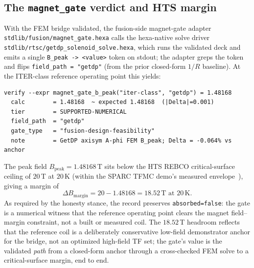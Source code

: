 \subsection{The \texttt{magnet\_gate} verdict and HTS margin}
\label{app:magnet:gate}

With the FEM bridge validated, the fusion-side magnet-gate adapter
\texttt{stdlib/fusion/magnet\_gate.hexa} calls the hexa-native solve driver
\texttt{stdlib/rtsc/getdp\_solenoid\_solve.hexa}, which runs the validated
deck and emits a single \verb|B_peak -> <value>| token on stdout; the adapter
greps the token and flips \texttt{field\_path = "getdp"} (from the prior
closed-form $1/R$ baseline). At the ITER-class reference operating point this
yields:
\begin{lstlisting}
verify --expr magnet_gate_b_peak("iter-class", "getdp") = 1.48168
  calc        = 1.48168  ~ expected 1.48168  (|Delta|=0.001)
  tier        = SUPPORTED-NUMERICAL
  field_path  = "getdp"
  gate_type   = "fusion-design-feasibility"
  note        = GetDP axisym A-phi FEM B_peak; Delta = -0.064% vs anchor
\end{lstlisting}
The peak field $B_{\text{peak}} = 1.48168$\,T sits below the HTS REBCO
critical-surface ceiling of $20$\,T at $20$\,K (within the SPARC TFMC demo's
measured envelope~\citep{hartwig2024sparcmagnet}), giving a margin of
\begin{equation}
\Delta B_{\text{margin}} = 20 - 1.48168 = 18.52\,\text{T at }20\,\text{K}.
\end{equation}
As required by the honesty stance, the record preserves
\texttt{absorbed=false}: the gate is a numerical witness that the reference
operating point clears the magnet field--margin constraint, not a built or
measured coil. The $18.52$\,T headroom reflects that the reference coil is a
deliberately conservative low-field demonstrator anchor for the bridge, not an
optimized high-field TF set; the gate's value is the validated \emph{path}
from a closed-form anchor through a cross-checked FEM solve to a critical-surface
margin, end to end.
